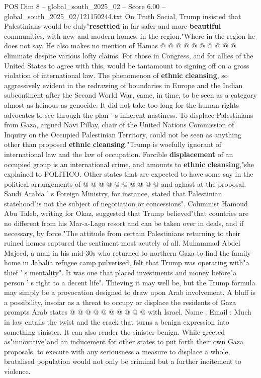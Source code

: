 \begin{textsample}{POS Dim 8 – global\_south\_2025\_02 – Score 6.00 – global\_south\_2025\_02/121150244.txt}
On Truth Social, Trump insisted that Palestinians would be duly"\textbf{resettled} in far safer and more \textbf{beautiful} communities, with new and modern homes, in the region."Where in the region he does not say.
He also makes no mention of Hamas @ @ @ @ @ @ @ @ @ @ eliminate despite various lofty claims.
For those in Congress, and for allies of the United States to agree with this, would be tantamount to signing off on a gross violation of international law.
The phenomenon of \textbf{ethnic} \textbf{cleansing}, so aggressively evident in the redrawing of boundaries in Europe and the Indian subcontinent after the Second World War, came, in time, to be seen as a category almost as heinous as genocide.
It did not take too long for the human rights advocates to see through the plan ' s inherent nastiness.
To displace Palestinians from Gaza, argued Navi Pillay, chair of the United Nations Commission of Inquiry on the Occupied Palestinian Territory, could not be seen as anything other than proposed \textbf{ethnic} \textbf{cleansing}."Trump is woefully ignorant of international law and the law of occupation.
Forcible \textbf{displacement} of an occupied group is an international crime, and amounts to \textbf{ethnic} \textbf{cleansing},"she explained to POLITICO.
Other states that are expected to have some say in the political arrangements of @ @ @ @ @ @ @ @ @ @ and aghast at the proposal.
Saudi Arabia ' s Foreign Ministry, for instance, stated that Palestinian statehood"is not the subject of negotiation or concessions".
Columnist Hamoud Abu Taleb, writing for Okaz, suggested that Trump believed"that countries are no different from his Mar-a-Lago resort and can be taken over in deals, and if necessary, by force."The attitude from certain Palestinians returning to their ruined homes captured the sentiment most acutely of all.
Muhammad Abdel Majeed, a man in his mid-30s who returned to northern Gaza to find the family home in Jabalia refugee camp pulverised, felt that Trump was operating with"a thief ' s mentality".
It was one that placed investments and money before"a person ' s right to a decent life".
Thieving it may well be, but the Trump formula may simply be a provocation designed to draw upon Arab involvement.
A bluff is a possibility, insofar as a threat to occupy or displace the residents of Gaza prompts Arab states @ @ @ @ @ @ @ @ @ @ with Israel.
Name : Email : Much in law entails the twist and the crack that turns a benign expression into something sinister.
It can also render the sinister benign.
While greeted as"innovative"and an inducement for other states to put forth their own Gaza proposals, to execute with any seriousness a measure to displace a whole, brutalised population would not only be criminal but a further incitement to violence.

\end{textsample}
